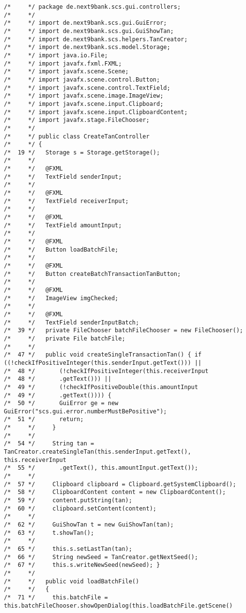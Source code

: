 \begin{lstlisting}
/*     */ package de.next9bank.scs.gui.controllers;
/*     */ 
/*     */ import de.next9bank.scs.gui.GuiError;
/*     */ import de.next9bank.scs.gui.GuiShowTan;
/*     */ import de.next9bank.scs.helpers.TanCreator;
/*     */ import de.next9bank.scs.model.Storage;
/*     */ import java.io.File;
/*     */ import javafx.fxml.FXML;
/*     */ import javafx.scene.Scene;
/*     */ import javafx.scene.control.Button;
/*     */ import javafx.scene.control.TextField;
/*     */ import javafx.scene.image.ImageView;
/*     */ import javafx.scene.input.Clipboard;
/*     */ import javafx.scene.input.ClipboardContent;
/*     */ import javafx.stage.FileChooser;
/*     */ 
/*     */ public class CreateTanController
/*     */ {
/*  19 */   Storage s = Storage.getStorage();
/*     */ 
/*     */   @FXML
/*     */   TextField senderInput;
/*     */ 
/*     */   @FXML
/*     */   TextField receiverInput;
/*     */ 
/*     */   @FXML
/*     */   TextField amountInput;
/*     */ 
/*     */   @FXML
/*     */   Button loadBatchFile;
/*     */ 
/*     */   @FXML
/*     */   Button createBatchTransactionTanButton;
/*     */ 
/*     */   @FXML
/*     */   ImageView imgChecked;
/*     */ 
/*     */   @FXML
/*     */   TextField senderInputBatch;
/*  39 */   private FileChooser batchFileChooser = new FileChooser();
/*     */   private File batchFile;
/*     */ 
/*  47 */   public void createSingleTransactionTan() { if ((!checkIfPositiveInteger(this.senderInput.getText())) || 
/*  48 */       (!checkIfPositiveInteger(this.receiverInput
/*  48 */       .getText())) || 
/*  49 */       (!checkIfPositiveDouble(this.amountInput
/*  49 */       .getText()))) {
/*  50 */       GuiError ge = new GuiError("scs.gui.error.numberMustBePositive");
/*  51 */       return;
/*     */     }
/*     */ 
/*  54 */     String tan = TanCreator.createSingleTan(this.senderInput.getText(), this.receiverInput
/*  55 */       .getText(), this.amountInput.getText());
/*     */ 
/*  57 */     Clipboard clipboard = Clipboard.getSystemClipboard();
/*  58 */     ClipboardContent content = new ClipboardContent();
/*  59 */     content.putString(tan);
/*  60 */     clipboard.setContent(content);
/*     */ 
/*  62 */     GuiShowTan t = new GuiShowTan(tan);
/*  63 */     t.showTan();
/*     */ 
/*  65 */     this.s.setLastTan(tan);
/*  66 */     String newSeed = TanCreator.getNextSeed();
/*  67 */     this.s.writeNewSeed(newSeed); }
/*     */ 
/*     */   public void loadBatchFile()
/*     */   {
/*  71 */     this.batchFile = this.batchFileChooser.showOpenDialog(this.loadBatchFile.getScene()

\end{lstlisting}
